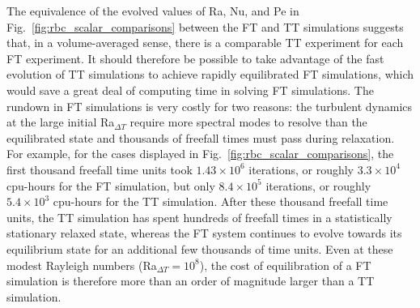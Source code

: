 \documentclass[aps, pre, onecolumn, nofootinbib, notitlepage, groupedaddress, amsfonts, amssymb, amsmath, longbibliography, superscriptaddress]{revtex4-1}
\begin{document}
The equivalence of the evolved values of Ra, Nu, and Pe in Fig.~\ref{fig:rbc_scalar_comparisons} between the FT and TT simulations suggests that, in a volume-averaged sense, there is a comparable TT experiment for each FT experiment.
It should therefore be possible to take advantage of the fast evolution of TT simulations to achieve rapidly equilibrated FT simulations, which would save a great deal of computing time in solving FT simulations.
The rundown in FT simulations is very costly for two reasons: the turbulent dynamics at the large initial Ra$_{\Delta T}$ require more spectral modes to resolve than the equilibrated state and thousands of freefall times must pass during relaxation.
For example, for the cases displayed in Fig.~\ref{fig:rbc_scalar_comparisons}, the first thousand freefall time units took $1.43\times10^6$ iterations, or roughly $3.3 \times 10^4$ cpu-hours for the FT simulation, but only  $8.4\times10^5$ iterations, or roughly $5.4\times 10^3$ cpu-hours for the TT simulation.
After these thousand freefall time units, the TT simulation has spent hundreds of freefall times in a statistically stationary relaxed state, whereas the FT system continues to evolve towards its equilibrium state for an additional few thousands of time units.
Even at these modest Rayleigh numbers (Ra$_{\Delta T} = 10^8$), the cost of equilibration of a FT simulation is therefore more than an order of magnitude larger than a TT simulation.
\end{document}
